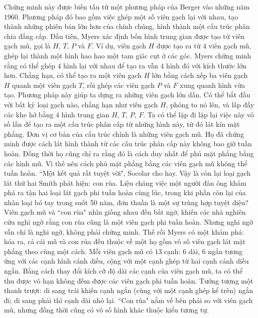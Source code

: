 \begin{multicols}{2}
\begin{figure}[H]
		\vspace*{-20pt}
	\end{figure}
	Chứng minh này được biến tấu từ một phương pháp của Berger vào những năm $1960$. Phương pháp đó bao gồm việc ghép một số viên gạch lại với nhau, tạo thành những phiên bản lớn hơn của chính chúng, hình thành một cấu trúc phân chia đẳng cấp. Đầu tiên, Myers xác định bốn hình trung gian được tạo từ viên gạch mũ, gọi là $H$, $T$, $P$ và $F$. Ví dụ, viên gạch $H$ được tạo ra từ $4$ viên gạch mũ, ghép lại thành một hình hao hao một tam giác cụt ở các góc. Myers chứng minh rằng có thể ghép $4$ hình lại với nhau để tạo ra vẫn $4$ hình đó với kích thước lớn hơn. Chẳng hạn, có thể tạo ra một viên gạch $H$ lớn bằng cách xếp ba viên gạch $H$ quanh một viên gạch $T$, rồi ghép các viên gạch $P$ và $F$ xung quanh hình vừa tạo.
	\vskip 0.1cm
	Phương pháp này giúp ta dựng ra những viên gạch lớn dần. Có thể bắt đầu với bất kỳ loại gạch nào, chẳng hạn như viên gạch $H$, phóng to nó lên, và lấp đầy các khe hở  bằng $4$ hình trung gian $H$, $T$, $P$, $F$. Ta có thể lặp đi lặp lại việc này vô số lần để tạo ra một cấu trúc phân cấp từ những hình này, từ đó lát kín mặt phẳng. Đơn vị cơ bản của cấu trúc chính là những viên gạch mũ. 
	\vskip 0.1cm
	Họ đã chứng minh được cách lát hình thành từ các cấu trúc phân cấp này không bao giờ tuần hoàn. Đồng thời họ cũng chỉ ra rằng đó là cách duy nhất để phủ mặt phẳng bằng các hình mũ. Vì thế nên cách phủ mặt phẳng bằng các viên gạch mũ không thể tuần hoàn. ``Một kết quả rất tuyệt vời", Socolar cho hay.
	\vskip 0.1cm
	Vậy là còn lại loại gạch lát thứ hai Smith phát hiện: con rùa. Liệu chăng việc một người đàn ông khám phá ra tận hai loại lát gạch phi tuần hoàn cùng lúc, trong khi phần còn lại của nhân loại bó tay trong suốt 50 năm, đơn thuần là một sự trùng hợp tuyệt diệu? Viên gạch mũ và ``con rùa" nhìn giống nhau đến bất ngờ, khiến các nhà nghiên cứu nghi ngờ rằng con rùa cũng là một viên gạch phi tuần hoàn. Nhưng nghi ngờ vẫn chỉ là nghi ngờ, không phải chứng minh.
	\vskip 0.1cm
	Thế rồi Myers có một khám phá: hóa ra, cả cái mũ và con rùa đều thuộc về một họ gồm vô số viên gạch lát mặt phẳng theo cùng một cách.
	\vskip 0.1cm
	Mỗi viên gạch mũ có $13$ cạnh: $6$ dài, $6$ ngắn tương ứng với các cạnh hình cánh diều, cộng với một cạnh ghép từ hai cạnh cánh diều ngắn. Bằng cách thay đổi kích cỡ độ dài các cạnh của viên gạch mũ, ta có thể thu được vô hạn không đếm được các viên gạch phi tuần hoàn. Tưởng tượng một thanh trượt: di sang trái khiến cạnh ngắn (cùng với một cạnh ghép kể trên) ngắn đi; di sang phải thì cạnh dài nhỏ lại. ``Con rùa" nằm về bên phải so với viên gạch mũ, nhưng đồng thời cũng có vô số hình khác thuộc kiểu tương tự.

\end{multicols}

